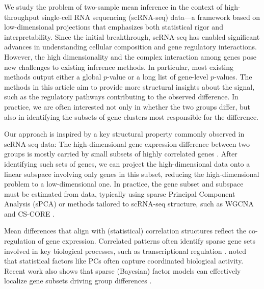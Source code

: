 \documentclass[11pt]{article}
\begin{document}


We study the problem of two-sample mean inference in the context of high-throughput single-cell RNA sequencing (scRNA-seq) data---a framework based on low-dimensional projections that emphasizes both statistical rigor and interpretability. Since the initial breakthrough, scRNA-seq has enabled significant advances in understanding cellular composition and gene regulatory interactions. However, the high dimensionality and the complex interaction among genes pose new challenges to existing inference methods. In particular, most existing methods output either a global $p$-value or a long list of gene-level $p$-values. The methods in this article aim to provide more structural insights about the signal, such as the regulatory pathways contributing to the observed difference. In practice, we are often interested not only in whether the two groups differ, but also in identifying the subsets of gene clusters most responsible for the difference.

Our approach is inspired by a key structural property commonly observed in scRNA-seq data: The high-dimensional gene expression difference between two groups is mostly carried by small subsets of highly correlated genes \citep{Lucas:2010, Stein-OBrien:2018}. After identifying such sets of genes, we can project the high-dimensional data onto a linear subspace involving only genes in this subset, reducing the high-dimensional problem to a low-dimensional one. In practice, the gene subset and subspace must be estimated from data, typically using sparse Principal Component Analysis (sPCA) or methods tailored to scRNA-seq structure, such as WGCNA \citep{langfelder2008wgcna} and CS-CORE \citep{su2023cell}. 

Mean differences that align with (statistical) correlation structures reflect the co-regulation of gene expression. Correlated patterns often identify sparse gene sets involved in key biological processes, such as transcriptional regulation \citep{Lucas:2010, Stein-OBrien:2018}. \citet{Knowles:2011} noted that statistical factors like PCs often capture coordinated biological activity. Recent work also shows that sparse (Bayesian) factor models can effectively localize gene subsets driving group differences \citep{zhou2023new}. 
\end{document}
